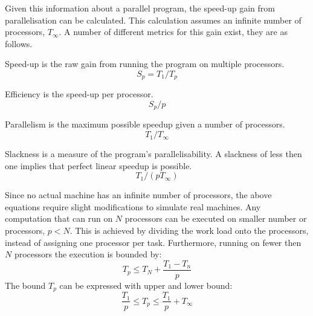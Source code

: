 Given this information about a parallel program, the speed-up gain from parallelisation can be calculated. This calculation assumes an infinite number of processors, $T_\infty$. A number of different metrics for this gain exist, they are as follows.
\begin{labeling}{\quad\quad}
    \item[Speed-up] is the raw gain from running the program on multiple processors.
    \begin{equation*}
        S_p = T_1/T_p
    \end{equation*}
    \item[Efficiency] is the speed-up per processor.
    \begin{equation*}
        S_p/p
    \end{equation*}
    \item[Parallelism] is the maximum possible speedup given a number of processors.
    \begin{equation*}
        T_1/T_\infty
    \end{equation*}
    \item[Slackness] is a measure of the program's parallelisability. A slackness of less then one implies that perfect linear speedup is possible.
    \begin{equation*}
        T_1/(pT_\infty)
    \end{equation*}
\end{labeling}
Since no actual machine has an infinite number of processors, the above equations require slight modifications to simulate real machines. Any computation that can run on $N$ processors can be executed on smaller number or processors, $p < N$\cite{Gustafson2011}. This is achieved by dividing the work load onto the processors, instead of assigning one processor per task. Furthermore, running on fewer then $N$ processors the execution is bounded by:
\begin{equation*}
    T_p \leq T_N + \frac{T_1 - T_n}{p}
\end{equation*}
The bound $T_p$ can be expressed with upper and lower bound\cite{brent1974parallel}:
\begin{equation*}
    \frac{T_1}{p} \leq T_p \leq \frac{T_1}{p} + T_\infty
\end{equation*}